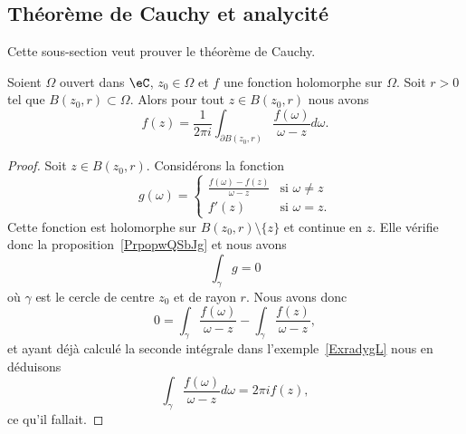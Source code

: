 \subsection{Théorème de Cauchy et analycité}

Cette sous-section veut prouver le théorème de Cauchy. 


\begin{theorem}    \label{ThoUHztQe}
	Soient \( \Omega\) ouvert dans \( \eC\), \( z_0\in \Omega\) et \( f\) une fonction holomorphe sur \( \Omega\). Soit \( r>0\) tel que \( B(z_0,r)\subset \Omega\). Alors pour tout \( z\in B(z_0,r)\) nous avons
	\begin{equation}    \label{EqPzUABM}
		f(z)=\frac{1}{ 2\pi i }\int_{\partial B(z_0,r)}\frac{ f(\omega) }{ \omega-z }d\omega.
	\end{equation}
\end{theorem}

\begin{proof}
	Soit \( z\in B(z_0,r)\). Considérons la fonction
	\begin{equation}
		g(\omega)=\begin{cases}
			\frac{ f(\omega)-f(z) }{ \omega-z } & \text{si } \omega\neq z \\
			f'(z)                               & \text{si } \omega=z.
		\end{cases}
	\end{equation}
	Cette fonction est holomorphe sur \( B(z_0,r)\setminus\{ z \}\) et continue en \( z\). Elle vérifie donc la proposition~\ref{PrpopwQSbJg} et nous avons
	\begin{equation}
		\int_{\gamma}g=0
	\end{equation}
	où \( \gamma\) est le cercle de centre \( z_0\) et de rayon \( r\). Nous avons donc
	\begin{equation}
		0=\int_{\gamma}\frac{ f(\omega) }{ \omega-z }-\int_{\gamma}\frac{ f(z) }{ \omega-z },
	\end{equation}
	et ayant déjà calculé la seconde intégrale dans l'exemple~\ref{ExradygL} nous en déduisons
	\begin{equation}
		\int_{\gamma}\frac{ f(\omega) }{ \omega-z }d\omega=2\pi if(z),
	\end{equation}
	ce qu'il fallait.
\end{proof}

